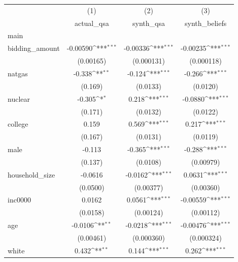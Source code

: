 {
\def\sym#1{\ifmmode^{#1}\else\(^{#1}\)\fi}
\begin{tabular}{l*{3}{c}}
\hline\hline
            &\multicolumn{1}{c}{(1)}&\multicolumn{1}{c}{(2)}&\multicolumn{1}{c}{(3)}\\
            &\multicolumn{1}{c}{actual\_qsa}&\multicolumn{1}{c}{synth\_qsa}&\multicolumn{1}{c}{synth\_beliefs}\\
\hline
main        &                     &                     &                     \\
bidding\_amount&    -0.00590\sym{***}&    -0.00336\sym{***}&    -0.00235\sym{***}\\
            &   (0.00165)         &  (0.000131)         &  (0.000118)         \\
[1em]
natgas      &      -0.338\sym{**} &      -0.124\sym{***}&      -0.266\sym{***}\\
            &     (0.169)         &    (0.0133)         &    (0.0120)         \\
[1em]
nuclear     &      -0.305\sym{*}  &       0.218\sym{***}&     -0.0880\sym{***}\\
            &     (0.171)         &    (0.0132)         &    (0.0122)         \\
[1em]
college     &       0.159         &       0.569\sym{***}&       0.217\sym{***}\\
            &     (0.167)         &    (0.0131)         &    (0.0119)         \\
[1em]
male        &      -0.113         &      -0.365\sym{***}&      -0.288\sym{***}\\
            &     (0.137)         &    (0.0108)         &   (0.00979)         \\
[1em]
household\_size&     -0.0616         &     -0.0162\sym{***}&      0.0631\sym{***}\\
            &    (0.0500)         &   (0.00377)         &   (0.00360)         \\
[1em]
inc0000     &      0.0162         &      0.0561\sym{***}&    -0.00559\sym{***}\\
            &    (0.0158)         &   (0.00124)         &   (0.00112)         \\
[1em]
age         &     -0.0106\sym{**} &     -0.0218\sym{***}&    -0.00476\sym{***}\\
            &   (0.00461)         &  (0.000360)         &  (0.000324)         \\
[1em]
white       &       0.432\sym{**} &       0.144\sym{***}&       0.262\sym{***}\\

\end{tabular}}
